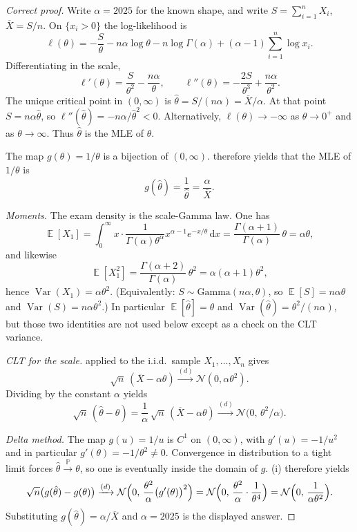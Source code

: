 \documentclass[11pt,a4paper]{article}
\DeclareMathOperator{\Var}{Var}
\DeclareMathOperator{\E}{\mathbb{E}}
\DeclareMathOperator{\Pbb}{\mathbb{P}}
\begin{document}
\begin{proof}[Correct proof]
Write \( \alpha=2025 \) for the known shape, and write \( S=\sum_{i=1}^{n}X_i \), \( \overline{X}=S/n \). On \( \{x_i>0\} \) the log-likelihood is
\[
\ell(\theta)
=
-\frac{S}{\theta}
-
n\alpha\log\theta
-
n\log\Gamma(\alpha)
+
(\alpha-1)\sum_{i=1}^{n}\log x_i.
\]
Differentiating in the scale,
\[
\ell'(\theta)
=
\frac{S}{\theta^{2}}
-
\frac{n\alpha}{\theta},
\qquad
\ell''(\theta)
=
-\frac{2S}{\theta^{3}}
+
\frac{n\alpha}{\theta^{2}}.
\]
The unique critical point in \( (0,\infty) \) is \( \hat{\theta}=S/(n\alpha)=\overline{X}/\alpha \). At that point \( S=n\alpha\hat{\theta} \), so \( \ell''(\hat{\theta})=-n\alpha/\hat{\theta}^{2}<0 \). Alternatively, \( \ell(\theta)\to-\infty \) as \( \theta\to 0^{+} \) and as \( \theta\to\infty \). Thus \( \hat{\theta} \) is the MLE of \( \theta \).

The map \( g(\theta)=1/\theta \) is a bijection of \( (0,\infty) \).  therefore yields that the MLE of \( 1/\theta \) is
\[
g(\hat{\theta})
=
\frac{1}{\hat{\theta}}
=
\frac{\alpha}{\overline{X}}.
\]

\emph{Moments.}
The exam density is the scale-Gamma law. One has
\[
\E[X_1]
=
\int_{0}^{\infty}x\cdot\frac{1}{\Gamma(\alpha)\theta^{\alpha}}x^{\alpha-1}e^{-x/\theta}\,\mathrm{d}x
=
\frac{\Gamma(\alpha+1)}{\Gamma(\alpha)}\,\theta
=
\alpha\theta,
\]
and likewise
\[
\E[X_1^{2}]
=
\frac{\Gamma(\alpha+2)}{\Gamma(\alpha)}\,\theta^{2}
=
\alpha(\alpha+1)\theta^{2},
\]
hence \( \Var(X_1)=\alpha\theta^{2} \). (Equivalently: \( S\sim\mathrm{Gamma}(n\alpha,\theta) \), so \( \E[S]=n\alpha\theta \) and \( \Var(S)=n\alpha\theta^{2} \).) In particular \( \E[\hat{\theta}]=\theta \) and \( \Var(\hat{\theta})=\theta^{2}/(n\alpha) \), but those two identities are not used below except as a check on the CLT variance.

\emph{CLT for the scale.}
 applied to the i.i.d.\ sample \( X_1,\dots,X_n \) gives
\[
\sqrt{n}\,(\overline{X}-\alpha\theta)
\xrightarrow{(d)}
\mathcal{N}(0,\alpha\theta^{2}).
\]
Dividing by the constant \( \alpha \) yields
\[
\sqrt{n}\,(\hat{\theta}-\theta)
=
\frac{1}{\alpha}\,\sqrt{n}\,(\overline{X}-\alpha\theta)
\xrightarrow{(d)}
\mathcal{N}\bigl(0,\,\theta^{2}/\alpha\bigr).
\]

\emph{Delta method.}
The map \( g(u)=1/u \) is \( C^{1} \) on \( (0,\infty) \), with \( g'(u)=-1/u^{2} \) and in particular \( g'(\theta)=-1/\theta^{2}\neq 0 \). Convergence in distribution to a tight limit forces \( \hat{\theta}\xrightarrow{\Pbb}\theta \), so one is eventually inside the domain of \( g \). (i) therefore yields
\[
\sqrt{n}\bigl(g(\hat{\theta})-g(\theta)\bigr)
\xrightarrow{(d)}
\mathcal{N}\Bigl(0,\,\frac{\theta^{2}}{\alpha}\bigl(g'(\theta)\bigr)^{2}\Bigr)
=
\mathcal{N}\Bigl(0,\,\frac{\theta^{2}}{\alpha}\cdot\frac{1}{\theta^{4}}\Bigr)
=
\mathcal{N}\Bigl(0,\,\frac{1}{\alpha\theta^{2}}\Bigr).
\]
Substituting \( g(\hat{\theta})=\alpha/\overline{X} \) and \( \alpha=2025 \) is the displayed answer.
\end{proof}
\end{document}
